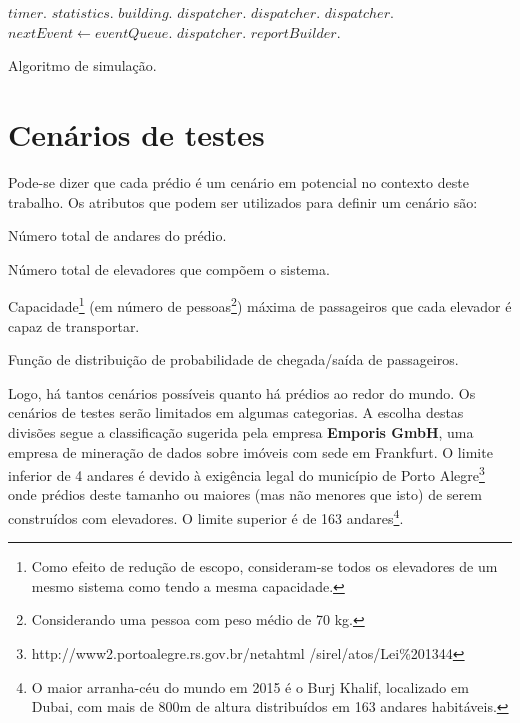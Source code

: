 \begin{algorithm}[H]
\begin{center}
\begin{algorithmic}[1]
  \State $timer.$
  \State $statistics.$
  \State $building.$
  \State $dispatcher.$
  \State $dispatcher.$
  \State $dispatcher.$
    \State $nextEvent \gets eventQueue.$
    \State $dispatcher.$
  \EndWhile
  \State $reportBuilder.$
\EndFunction
\end{algorithmic}
\end{center}
\caption
   {\label{alg:sim}Algoritmo de simulação.}
\end{algorithm}

\section{\label{section:scenarios}Cenários de testes}

Pode-se dizer que cada prédio é um cenário em potencial no contexto deste
trabalho. Os atributos que podem ser utilizados para definir um cenário são:

\begin{description}[leftmargin=!,labelwidth=\widthof{\bfseries Pu}]
  \item[F]
  Número total de andares do prédio.
  \item[E]
  Número total de elevadores que compõem o sistema.
  \item[C]
  Capacidade\footnote{Como efeito de redução de escopo, consideram-se todos os
  elevadores de um mesmo sistema como tendo a mesma capacidade.} (em número de
  pessoas\footnote{Considerando uma pessoa com peso médio de 70 kg.}) máxima de
  passageiros que cada elevador é capaz de transportar.
  \item[D]
  Função de distribuição de probabilidade de chegada/saída de passageiros.
\end{description}

Logo, há tantos cenários possíveis quanto há prédios ao redor do mundo. Os
cenários de testes serão limitados em algumas categorias. A escolha destas
divisões segue a classificação \cite{Emporis15} sugerida pela empresa
\textbf{Emporis GmbH}, uma empresa de mineração de dados sobre imóveis com sede
em Frankfurt. O limite inferior de 4 andares é devido à exigência legal do
município de Porto Alegre\footnote{http://www2.portoalegre.rs.gov.br/netahtml
/sirel/atos/Lei\%201344} onde prédios deste tamanho ou maiores (mas não menores
que isto) de serem construídos com elevadores. O limite superior é de 163
andares\footnote{O maior arranha-céu do mundo em 2015 é o Burj Khalif,
localizado em Dubai, com mais de 800m de altura distribuídos em 163 andares
habitáveis.}.

